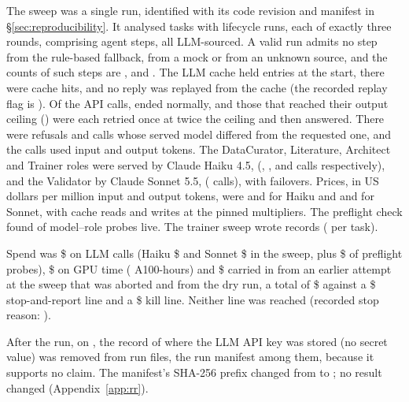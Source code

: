 The sweep was a single run, identified with its code revision and manifest in
\S\ref{sec:reproducibility}. It analysed \resNTasks{} tasks with \resNLifecycleRuns{} lifecycle
runs, each of exactly three rounds, comprising \resNSteps{} agent steps, all LLM-sourced. A
valid run admits no step from the rule-based fallback, from a mock or from an unknown source,
and the counts of such steps are \resNFallback, \resNStepsMock{} and \resNStepsUnknown. The LLM
cache held \resCacheStart{} entries at the start, there were \resCacheHits{} cache hits, and
no reply was replayed from the cache (the recorded replay flag is \resReplay). Of the
\resNCalls{} API calls, \resStopEndTurn{} ended normally, and those that reached their output
ceiling (\resStopMaxTokens) were each retried once at twice the ceiling and then answered. There were \resRefusals{} refusals and \resServedMismatch{} calls whose served model
differed from the requested one, and the calls used \resTokensIn{} input and \resTokensOut{}
output tokens. The DataCurator, Literature, Architect and Trainer roles were served by
Claude Haiku 4.5, \resRoleServedCurator{} (\resRoleCallsCurator, \resRoleCallsLiterature, \resRoleCallsArchitect{}
and \resRoleCallsTrainer{} calls respectively), and the Validator by Claude Sonnet 5.5,
\resRoleServedValidator{}
(\resRoleCallsValidator{} calls), with \resNFailover{} failovers. Prices, in US dollars per
million input and output tokens, were \resPriceHaikuIn{} and \resPriceHaikuOut{} for Haiku and
\resPriceSonnetIn{} and \resPriceSonnetOut{} for Sonnet, with cache reads and writes at the
pinned multipliers. The preflight check found \resLivenessOkPairs{} of \resLivenessTotalPairs{}
model--role probes live. The trainer sweep wrote \resNTrainerRuns{} records
(\resNTrainerRecordsPerTask{} per task).

Spend was \$\resSpendLLM{} on LLM calls (Haiku \$\resSpendHaiku{} and Sonnet \$\resSpendSonnet{}
in the sweep, plus \$\resSpendPreflight{} of preflight probes), \$\resSpendGPU{} on GPU time
(\resGPUHours{} A100-hours) and \$\resSpendPrior{} carried in from an earlier attempt at the sweep that was aborted and from the dry run, a total of
\$\resSpendTotal{} against a \$\resSpendStopLine{} stop-and-report line and a \$\resKillLine{}
kill line. Neither line was reached (recorded stop reason: \resStopReasonNone).

After the run, on \resRROneDate, the record of where the LLM API key was stored (no secret
value) was removed from \resRROneFileCount{} run files, the run manifest among them, because it
supports no claim. The manifest's SHA-256 prefix changed from \resManifestShaSuperseded{} to
\resManifestSha; no result changed (Appendix~\ref{app:rr}).

